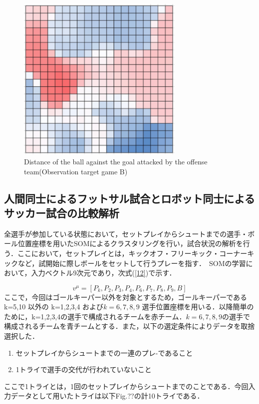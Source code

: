 \begin{figure}[htb]
  \begin{center}
    \includegraphics[clip,height=8.0cm]{figure/Distance_of_the_ball_against_the_goal_attacked_by_the_offense_team_Observation_target_game_B.eps}
    \caption{Distance of the ball against the goal attacked by the offense team(Observation target game B)}
    \label{fig:SOM_result08}
  \end{center}
\end{figure}

\clearpage%


\subsection{人間同士によるフットサル試合とロボット同士によるサッカー試合の比較解析}
全選手が参加している状態において，セットプレイからシュートまでの選手・ボール位置座標を用いたSOMによるクラスタリングを行い，試合状況の解析を行う．ここにおいて，セットプレイとは，キックオフ・フリーキック・コーナーキックなど，試開始に際しボールをセットして行うプレーを指す．　SOMの学習において，入力ベクトル9次元であり，次式(\ref{12})で示す．

\begin{equation}
	\label{12}
	v^{\mu} = [P_k, P_2, P_3, P_4, P_6, P_7, P_8, P_9, B]
\end{equation}
ここで，今回はゴールキーパー以外を対象とするため，ゴールキーパーである k=5,10 以外の  k=1,2,3,4 および$k=6,7,8,9$ 選手位置座標を用いる．以降簡単のために，k=1,2,3,4の選手で構成されるチームを赤チーム．$k=6,7,8,9$の選手で構成されるチームを青チームとする．また，以下の選定条件によりデータを取捨選択した．
\begin{enumerate}
  \item セットプレイからシュートまでの一連のプレ-であること
  \item 1トライで選手の交代が行われていないこと
\end{enumerate}
 ここで1トライとは，1回のセットプレイからシュートまでのことである．今回入力データとして用いたトライは以下Fig.??の計10トライである．
 
